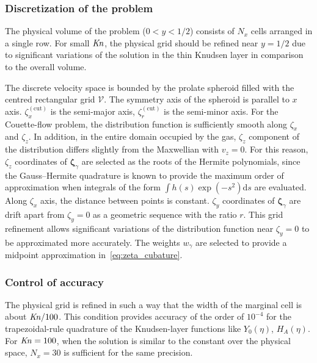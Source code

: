 \documentclass[review]{elsarticle}
\newcommand{\Kn}{\mbox{\textit{Kn}}}
\newcommand{\dd}{\mathrm{d}}
\newcommand{\bzeta}{\boldsymbol{\zeta}}
\begin{document}
\subsubsection{Discretization of the problem}

The physical volume of the problem (\(0<y<1/2\)) consists of \(N_x\) cells arranged in a single row.
For small \(\Kn\), the physical grid should be refined near \(y=1/2\)
due to significant variations of the solution in the thin Knudsen layer in comparison to the overall volume.

The discrete velocity space is bounded by the prolate spheroid
filled with the centred rectangular grid \(\mathcal{V}\).
The symmetry axis of the spheroid is parallel to \(x\) axis.
\(\zeta^{(\mathrm{cut})}_x\) is the semi-major axis, \(\zeta^{(\mathrm{cut})}_r\) is the semi-minor axis.
For the Couette-flow problem, the distribution function is sufficiently smooth along \(\zeta_x\) and \(\zeta_z\).
In addition, in the entire domain occupied by the gas, \(\zeta_z\) component of the distribution
differs slightly from the Maxwellian with \(v_z=0\).
For this reason, \(\zeta_z\) coordinates of \(\bzeta_\gamma\) are selected as the roots of the Hermite polynomials,
since the Gauss--Hermite quadrature is known to provide the maximum order of approximation
when integrals of the form \(\int h(s)\exp(-s^2)\dd{s}\) are evaluated.
Along \(\zeta_x\) axis, the distance between points is constant.
\(\zeta_y\) coordinates of \(\bzeta_\gamma\) are drift apart from \(\zeta_y=0\)
as a geometric sequence with the ratio \(r\).
This grid refinement allows significant variations of the distribution function
near \(\zeta_y=0\) to be approximated more accurately.
The weights \(w_\gamma\) are selected to provide a midpoint approximation in~\eqref{eq:zeta_cubature}.

\subsubsection{Control of accuracy}

The physical grid is refined in such a way
that the width of the marginal cell is about \(\Kn/100\).
This condition provides accuracy of the order of \(10^{-4}\) for the trapezoidal-rule quadrature
of the Knudsen-layer functions like \(Y_0(\eta)\), \(H_A(\eta)\).
For \(\Kn=100\), when the solution is similar to the constant over the physical space,
\(N_x = 30\) is sufficient for the same precision.
\end{document}
